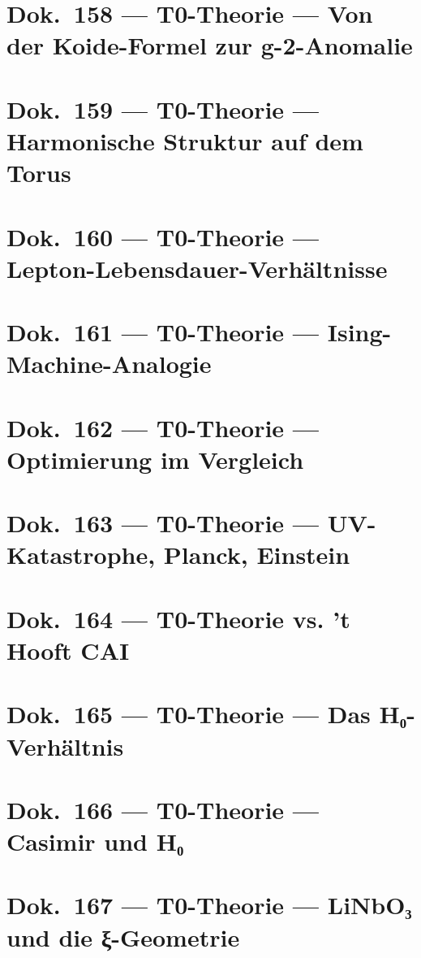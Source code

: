 	\chapter{Dok.~158 --- T0-Theorie — Von der Koide-Formel zur g-2-Anomalie}
	
	\chapter{Dok.~159 --- T0-Theorie — Harmonische Struktur auf dem Torus}
	
	\chapter{Dok.~160 --- T0-Theorie — Lepton-Lebensdauer-Verhältnisse}
	
	\chapter{Dok.~161 --- T0-Theorie — Ising-Machine-Analogie}
	
	\chapter{Dok.~162 --- T0-Theorie — Optimierung im Vergleich}
	
	\chapter{Dok.~163 --- T0-Theorie — UV-Katastrophe, Planck, Einstein}
	
	\chapter{Dok.~164 --- T0-Theorie vs. ’t Hooft CAI}
	
	\chapter{Dok.~165 --- T0-Theorie — Das H₀-Verhältnis}
	
	\chapter{Dok.~166 --- T0-Theorie — Casimir und H₀}
	
	\chapter{Dok.~167 --- T0-Theorie — LiNbO₃ und die ξ-Geometrie}
	

